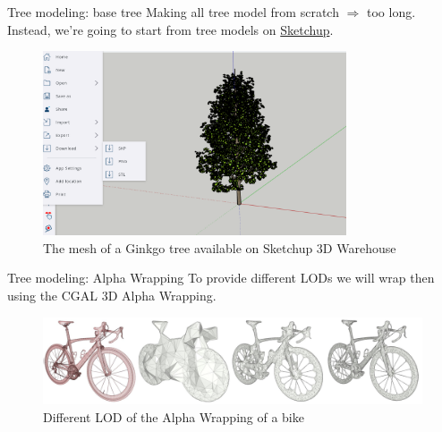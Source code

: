 \documentclass[10pt]{beamer}
\begin{document}
\begin{frame}{Tree modeling: base tree}
Making all tree model from scratch $\Longrightarrow$ too long. \\
Instead, we're going to start from tree models on \href{https://app.sketchup.com/app}{Sketchup}.

\begin{figure}[H]
    \centering
        \centering
        \includegraphics[width=0.8\textwidth]{images/ginkgo_sketchup.png}
        \caption{The mesh of a Ginkgo tree available on Sketchup 3D Warehouse}
\end{figure}
\end{frame}



\begin{frame}{Tree modeling: Alpha Wrapping}
  To provide different LODs we will wrap then using the CGAL 3D 
  Alpha Wrapping\cite{cgal_alpha_wrapper}.

  \begin{figure}[H]
    \centering
        \centering
        \includegraphics[width=\textwidth]{images/aw3_bike_lod.jpg}
        \caption{Different LOD of the Alpha Wrapping of a bike}
\end{figure}
\end{frame}
\end{document}
